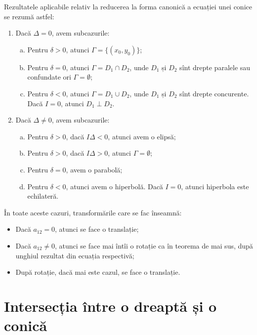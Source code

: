 \documentclass[11pt,a4paper]{article}
\theoremstyle{dotless}
\theoremstyle{dotlessdr}
\begin{document}
Rezultatele aplicabile relativ la reducerea la forma canonică a ecuației unei
conice se rezumă astfel:

\begin{enumerate}[(1)]
	\item Dacă $\Delta = 0$, avem subcazurile:
	    \begin{enumerate}[(a)]
	        \item Pentru $\delta > 0$, atunci $\Gamma = \{(x_0, y_0)\}$;
	        \item Pentru $\delta = 0$, atunci $\Gamma = D_1 \cap D_2$, unde 
$D_1$ și $D_2$ sînt drepte paralele sau confundate ori $\Gamma = \emptyset$;
            \item Pentru $\delta < 0$, atunci $\Gamma = D_1 \cup D_2$, unde 
$D_1$ și $D_2$ sînt drepte concurente. Dacă $I = 0 $, atunci $D_1 \perp D_2$.
        \end{enumerate}
    \item Dacă $\Delta \neq 0$, avem subcazurile:
        \begin{enumerate}[(a)]
	        \item Pentru $\delta > 0$, dacă $I\Delta < 0$, atunci avem o elipsă;
	        \item Pentru $\delta > 0$, dacă $I\Delta > 0$, atunci 
$\Gamma = \emptyset$;
            \item Pentru $\delta = 0$, avem o parabolă;
            \item Pentru $\delta < 0$, atunci avem o hiperbolă. Dacă $I = 0$,
atunci hiperbola este echilateră.
        \end{enumerate}
\end{enumerate}

În toate aceste cazuri, transformările care se fac înseamnă:
\begin{itemize}
	\item Dacă $a_{12} = 0$, atunci se face o translație;
	\item Dacă $a_{12} \neq 0$, atunci se face mai întîi o rotație ca în teorema
de mai sus, după unghiul rezultat din ecuația respectivă;
    \item După rotație, dacă mai este cazul, se face o translație.
\end{itemize}


\section{Intersecția între o dreaptă și o conică}
\end{document}
